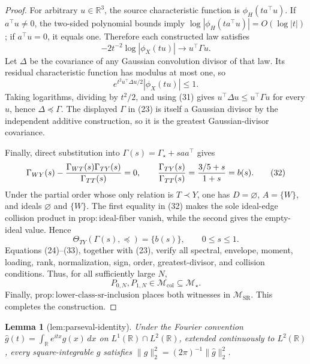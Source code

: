 \documentclass{article}
\newtheorem{lemma}{Lemma}
\begin{document}
\begin{proof}
For arbitrary \(u\in\mathbb R^3\), the source characteristic function is \(\phi_H(ta^\top u)\).  If \(a^\top u\ne0\), the two-sided polynomial bounds imply \(\log|\phi_H(ta^\top u)|=O(\log|t|)\); if \(a^\top u=0\), it equals one.  Therefore each constructed law satisfies
\[
 -2t^{-2}\log|\phi_X(tu)|\longrightarrow u^\top\Gamma u. \tag{31}
\]
Let \(\Delta\) be the covariance of any Gaussian convolution divisor of that law.  Its residual characteristic function has modulus at most one, so
\[
 e^{t^2u^\top\Delta u/2}|\phi_X(tu)|\le1.
\]
Taking logarithms, dividing by \(t^2/2\), and using (31) gives \(u^\top\Delta u\le u^\top\Gamma u\) for every \(u\), hence \(\Delta\preceq\Gamma\).  The displayed \(\Gamma\) in (23) is itself a Gaussian divisor by the independent additive construction, so it is the greatest Gaussian-divisor covariance.

Finally, direct substitution into \(\Gamma(s)=\Gamma_\star+saa^\top\) gives
\[
 \Gamma_{WY}(s)-{\Gamma_{WT}(s)\Gamma_{TY}(s)\over\Gamma_{TT}(s)}=0,
 \qquad
 {\Gamma_{TY}(s)\over\Gamma_{TT}(s)}
 ={3/5+s\over1+s}=b(s). \tag{32}
\]
Under the partial order whose only relation is \(T\prec Y\), one has \(D=\varnothing\), \(A=\{W\}\), and ideals \(\varnothing\) and \(\{W\}\).  The first equality in (32) makes the sole ideal-edge collision product in \(\mathrm{prop:ideal\text{-}fiber}\) vanish, while the second gives the empty-ideal value.  Hence
\[
 \Theta_{TY}(\Gamma(s),\preceq)=\{b(s)\},
 \qquad0\le s\le1. \tag{33}
\]
Equations (24)--(33), together with (23), verify all spectral, envelope, moment, loading, rank, normalization, sign, order, greatest-divisor, and collision conditions.  Thus, for all sufficiently large \(N\),
\[
 P_{0,N},P_{1,N}\in\mathcal M_{\mathrm{col}}\subseteq\mathcal M_\star.
\]
Finally, \(\mathrm{prop:lower\text{-}class\text{-}sr\text{-}inclusion}\) places both witnesses in \(\mathcal M_{\mathrm{SR}}\).  This completes the construction.
\end{proof}

\begin{lemma}[lem:parseval-identity]\label{lem:parseval-identity}
Under the Fourier convention \(\widehat g(t)=\int_{\mathbb R}e^{itx}g(x)\,dx\) on \(L^1(\mathbb R)\cap L^2(\mathbb R)\), extended continuously to \(L^2(\mathbb R)\), every square-integrable \(g\) satisfies \(\|g\|_2^2=(2\pi)^{-1}\|\widehat g\|_2^2\).
\end{lemma}
\end{document}

